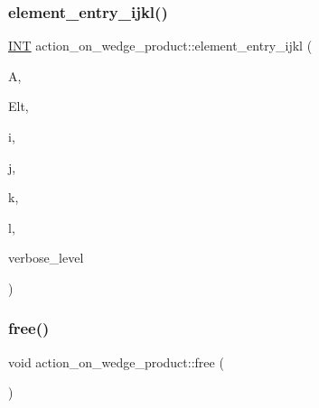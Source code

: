 \subsubsection{\texorpdfstring{element\+\_\+entry\+\_\+ijkl()}{element\_entry\_ijkl()}}
{\footnotesize\ttfamily \mbox{\hyperlink{galois_8h_a09fddde158a3a20bd2dcadb609de11dc}{I\+NT}} action\+\_\+on\+\_\+wedge\+\_\+product\+::element\+\_\+entry\+\_\+ijkl (\begin{DoxyParamCaption}\item[{\mbox{\hyperlink{classaction}{action}} \&}]{A,  }\item[{\mbox{\hyperlink{galois_8h_a09fddde158a3a20bd2dcadb609de11dc}{I\+NT}} $\ast$}]{Elt,  }\item[{\mbox{\hyperlink{galois_8h_a09fddde158a3a20bd2dcadb609de11dc}{I\+NT}}}]{i,  }\item[{\mbox{\hyperlink{galois_8h_a09fddde158a3a20bd2dcadb609de11dc}{I\+NT}}}]{j,  }\item[{\mbox{\hyperlink{galois_8h_a09fddde158a3a20bd2dcadb609de11dc}{I\+NT}}}]{k,  }\item[{\mbox{\hyperlink{galois_8h_a09fddde158a3a20bd2dcadb609de11dc}{I\+NT}}}]{l,  }\item[{\mbox{\hyperlink{galois_8h_a09fddde158a3a20bd2dcadb609de11dc}{I\+NT}}}]{verbose\+\_\+level }\end{DoxyParamCaption})}

\mbox{\label{classaction__on__wedge__product_a1f515c681daf5c8690df1d9cdb76e2cf}} 
\subsubsection{\texorpdfstring{free()}{free()}}
{\footnotesize\ttfamily void action\+\_\+on\+\_\+wedge\+\_\+product\+::free (\begin{DoxyParamCaption}{ }\end{DoxyParamCaption})}

\mbox{\label{classaction__on__wedge__product_a945e921589de9125fabe2e7a8b698081}} 
